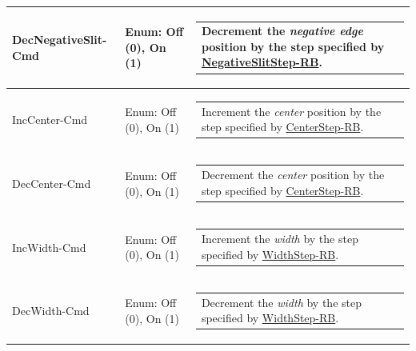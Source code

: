\documentclass[openany]{article}
\begin{document}
\begin{longtable}{| m{4.5cm} m{2.5cm}  m{7.0cm} |}
        DecNegativeSlit-Cmd & Enum: Off (0), On (1) & \begin{tabular}{@{}m{6cm}@{}}
                Decrement the \emph{negative edge} position by the step specified by \hyperlink{pv:negative-edge-step}{NegativeSlitStep-RB}.
            \end{tabular} \hypertarget{pv:inc-center-cmd}{}\\ \hline
        IncCenter-Cmd & Enum: Off (0), On (1) & \begin{tabular}{@{}m{6cm}@{}}
                Increment the \emph{center} position by the step specified by \hyperlink{pv:center-step}{CenterStep-RB}.
            \end{tabular} \hypertarget{pv:dec-center-cmd}{}\\ \hline
        DecCenter-Cmd & Enum: Off (0), On (1) & \begin{tabular}{@{}m{6cm}@{}}
                Decrement the \emph{center} position by the step specified by \hyperlink{pv:center-step}{CenterStep-RB}.
            \end{tabular} \hypertarget{pv:inc-width-cmd}{}\\ \hline
        IncWidth-Cmd & Enum: Off (0), On (1) & \begin{tabular}{@{}m{6cm}@{}}
                Increment the \emph{width} by the step specified by \hyperlink{pv:width-step}{WidthStep-RB}.
            \end{tabular} \hypertarget{pv:dec-width-cmd}{}\\ \hline
        DecWidth-Cmd & Enum: Off (0), On (1) & \begin{tabular}{@{}m{6cm}@{}}
                Decrement the \emph{width} by the step specified by \hyperlink{pv:width-step}{WidthStep-RB}.
            \end{tabular} \hypertarget{}{}\\ \hline
    \end{longtable}
\end{document}
